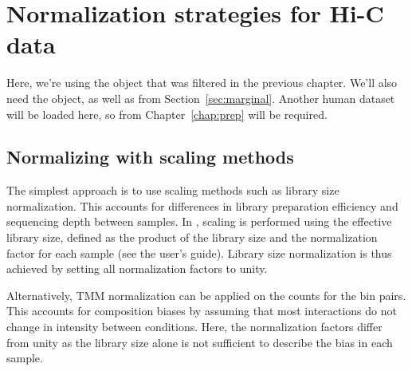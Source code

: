 \documentclass{report}\usepackage[]{graphicx}\usepackage[usenames,dvipsnames]{color}
\newcommand{\hlnum}[1]{\textcolor[rgb]{0.816,0.125,0.439}{#1}}%
\newcommand{\hlcom}[1]{\textcolor[rgb]{0.502,0.502,0.502}{\textit{#1}}}%
\newcommand{\hlopt}[1]{\textcolor[rgb]{0,0,0}{#1}}%
\newcommand{\hlstd}[1]{\textcolor[rgb]{0.251,0.251,0.251}{#1}}%
\newcommand{\hlkwb}[1]{\textcolor[rgb]{0,0,0}{#1}}%
\newcommand{\hlkwc}[1]{\textcolor[rgb]{0.251,0.251,0.251}{#1}}%
\newcommand{\hlkwd}[1]{\textcolor[rgb]{0.878,0.439,0.125}{#1}}%
\newenvironment{knitrout}{}{} %
\newenvironment{combox}
{ \definecolor{shadecolor}{RGB}{255, 240, 240} \begin{shaded}\begin{center}\begin{minipage}[t]{0.95\textwidth} }
{ \end{minipage}\end{center}\end{shaded} \definecolor{shadecolor}{RGB}{240,240,240} }
\begin{document}
\chapter{Normalization strategies for Hi-C data}

\begin{combox}
Here, we're using the  object that was filtered in the previous chapter.
We'll also need the  object, as well as  from Section~\ref{sec:marginal}.
Another human dataset will be loaded here, so  from Chapter~\ref{chap:prep} will be required.
\end{combox}

\section{Normalizing with scaling methods}
\label{sec:simplenorm}

The simplest approach is to use scaling methods such as library size normalization.
This accounts for differences in library preparation efficiency and sequencing depth between samples.
In , scaling is performed using the effective library size, defined as the product of the library size and the normalization factor for each sample (see the  user's guide).
Library size normalization is thus achieved by setting all normalization factors to unity.

\begin{knitrout}
\color{fgcolor}
\end{knitrout}

Alternatively, TMM normalization \cite{oshlack2010tmm} can be applied on the counts for the bin pairs.
This accounts for composition biases by assuming that most interactions do not change in intensity between conditions.
Here, the normalization factors differ from unity as the library size alone is not sufficient to describe the bias in each sample.

\begin{knitrout}
\color{fgcolor}
\end{knitrout}
\end{document}
